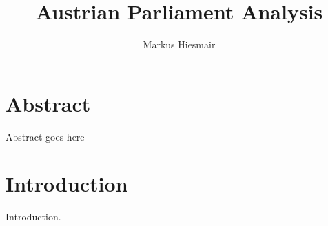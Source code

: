\documentclass[12pt]{report}
\title{Austrian Parliament Analysis}
\author{Markus Hiesmair}
\begin{document}
\maketitle
\newpage

\chapter*{Abstract}
Abstract goes here

\tableofcontents


\chapter{Introduction}
Introduction.
\end{document}
